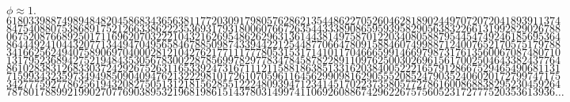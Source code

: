 \documentclass[mathematics_cheat_sheet.tex]{subfiles}
\begin{document}
\vspace{0.5\baselineskip}$\phi\approx1.$\\
$6180339887498948482045868343656381177203091798057628621354486227052604628189024497072072041893911374$\\
$8475408807538689175212663386222353693179318006076672635443338908659593958290563832266131992829026788$\\
$0675208766892501711696207032221043216269548626296313614438149758701220340805887954454749246185695364$\\
$8644492410443207713449470495658467885098743394422125448770664780915884607499887124007652170575179788$\\
$3416625624940758906970400028121042762177111777805315317141011704666599146697987317613560067087480710$\\
$1317952368942752194843530567830022878569978297783478458782289110976250030269615617002504643382437764$\\
$8610283831268330372429267526311653392473167111211588186385133162038400522216579128667529465490681131$\\
$7159934323597349498509040947621322298101726107059611645629909816290555208524790352406020172799747175$\\
$3427775927786256194320827505131218156285512224809394712341451702237358057727861600868838295230459264$\\
$787801788992199027077690389532196819861514378031499741106926088674296226757560523172777520353613936\dots$
\end{document}
